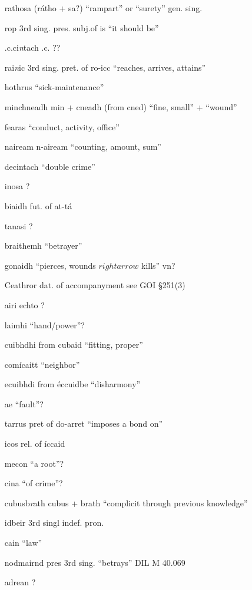 \documentclass[11pt]{article}
\begin{document}
\begin{enumerate}
  \item[rathosa] (r\'{a}tho + sa?) \enquote{rampart} or \enquote{surety} gen. sing.
  \item[rop] 3rd sing. pres. subj.of is \enquote{it should be}
  \item[.c.ci\emph{n}tach] .c. ??
  \item[rai\emph{n}ic] 3rd sing. pret. of ro-icc \enquote{reaches, arrives, attains}
  \item[hothrus] \enquote{sick-maintenance}
  \item[minchneadh] min + cneadh (from cned) \enquote{fine, small} + \enquote{wound}
  \item[fearas] \enquote{conduct, activity, office}
  \item[naiream] n-aiream \enquote{counting, amount, sum}
  \item[decintach] \enquote{double crime}
  \item[inosa] ?
  \item[biaidh] fut. of at-t\'{a}
  \item[tanasi] ?
  \item[braithemh] \enquote{betrayer}
  \item[gonaidh] \enquote{pierces, wounds $rightarrow$ kills} vn?
  \item[Ceathror] dat. of accompanyment see GOI \S 251(3)
  \item[airi echto] ?
  \item[laimhi]  \enquote{hand/power}?
  \item[cuibhdhi] from cubaid \enquote{fitting, proper}
  \item[com\'{i}caitt] \enquote{neighbor}
  \item[ecuibhdi] from \'{e}ccuidbe \enquote{disharmony}
  \item[ae] \enquote{fault}?
  \item[tarrus] pret of do-arret \enquote{imposes a bond on}
  \item[icos] rel. of \'{i}ccaid
  \item[mecon] \enquote{a root}?
  \item[cina] \enquote{of crime}?
  \item[cubusb\emph{r}ath] cubus + brath \enquote{complicit through previous knowledge}
  \item[idbeir] 3rd singl indef. pron. 
  \item[cain] \enquote{law}
  \item[nodmairnd] pres 3rd sing. \enquote{betrays} DIL M 40.069
  \item[adrean] ?

\end{enumerate}
\end{document}
